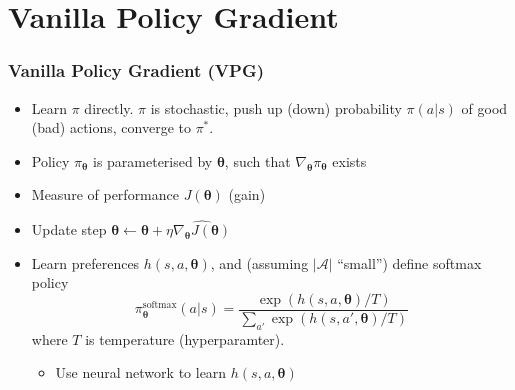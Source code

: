 \documentclass[10pt,a4paper]{beamer}
\newcommand{\bth}{{\boldsymbol{\theta}}}
\begin{document}
\section{Vanilla Policy Gradient}
\begin{frame}
	\frametitle{Vanilla Policy Gradient (VPG)}
	\begin{itemize}
		\item Learn $\pi$ directly. $\pi$ is stochastic, push up (down) probability $\pi(a|s)$
		of good (bad) actions, converge to $\pi^*$.
		\pause
		\item Policy $\pi_\bth$ is parameterised by $\bth$, such that $\nabla_\bth \pi_\bth$ exists
		\pause
		\item Measure of performance $J(\bth)$ (gain)
		\pause
		\item Update step $\bth \leftarrow \bth + \eta \widehat{\nabla_{\bth} J(\bth)}$ 
		\pause
			\item Learn preferences $h(s,a, \bth)$, and (assuming $|\mathcal{A}|$ ``small'')
			define softmax policy
			$$
			\pi^{\text{softmax}}_\bth(a|s) = \frac{\exp(h(s,a,\bth)/T)}{\sum_{a'} \exp(h(s,a',\bth)/T)}
			$$ 
			where $T$ is temperature (hyperparamter).
			\begin{itemize}
					\item Use neural network to learn $h(s,a,\bth)$
				\end{itemize}
	\end{itemize}
\end{frame}
%
\end{document}

